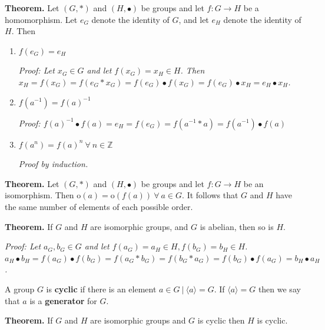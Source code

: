 \documentclass{article}
\begin{document}
\textbf{Theorem.} Let \((G, *)\) and \((H, \bullet)\) be groups and let \(f: G \to H\) be a homomorphism. Let \(e_G\) denote the identity of \(G\), and let \(e_H\) denote the identity of \(H\). Then

\begin{enumerate}[1.]

\item \(f(e_G) = e_H\)

\begin{center}
\textit{Proof: Let \(x_G \in G\) and let \(f(x_G) = x_H \in H\). Then \(x_H = f(x_G) = f(e_G * x_G) = f(e_G) \bullet f(x_G) = f(e_G) \bullet x_H = e_H \bullet x_H\).}
\end{center}

\item \(f(a^{-1}) = f(a)^{-1}\)

\begin{center}
\textit{Proof: \(f(a)^{-1} \bullet f(a) = e_H = f(e_G) = f(a^{-1} * a) = f(a^{-1}) \bullet f(a)\)}
\end{center}

\item \(f(a^n) = f(a)^n \ \forall \ n \in \mathbb{Z}\)

\begin{center}
\textit{Proof by induction.}
\end{center}

\end{enumerate}

\textbf{Theorem.} Let \((G, *)\) and \((H, \bullet)\) be groups and let \(f:G \to H\) be an isomorphism. Then \(\text{o}(a) = \text{o}(f(a)) \ \forall \ a \in G\). It follows that \(G\) and \(H\) have the same number of elements of each possible order.

\textbf{Theorem.} If \(G\) and \(H\) are isomorphic groups, and \(G\) is abelian, then so is \(H\).

\begin{center}
\textit{Proof: Let \(a_G, b_G \in G\) and let \(f(a_G) = a_H \in H, f(b_G) = b_H \in H\). \(a_H \bullet b_H = f(a_G) \bullet f(b_G) = f(a_G * b_G) = f(b_G * a_G) = f(b_G) \bullet f(a_G) = b_H \bullet a_H\).}
\end{center}

A group \(G\) is \textbf{cyclic} if there is an element \(a \in G \ | \ \langle a \rangle = G\). If \(\langle a \rangle = G\) then we say that \(a\) is a \textbf{generator} for \(G\). 

\textbf{Theorem.} If \(G\) and \(H\) are isomorphic groups and \(G\) is cyclic then \(H\) is cyclic.
\end{document}
